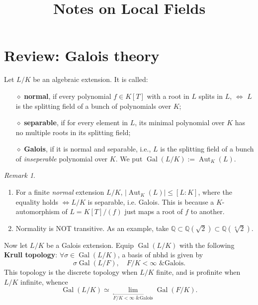 \documentclass{article}
\title{Notes on Local Fields}
\author{}
\date{}
\theoremstyle{definition}
\theoremstyle{remark}
\newtheorem*{remark}{Remark}
\DeclareMathOperator{\gal}{Gal}
\newcommand{\Q}{\mathbb{Q}}
\DeclareMathOperator{\aut}{Aut} %
\begin{document}
\maketitle

\section{Review: Galois theory}
Let $L/K$ be an algebraic extension. It is called: \begin{enumerate}
    \item [$\diamond$]\textbf{normal}, if every polynomial $f\in K[T]$ with a root in $L$ splits in $L$, $\iff$ $L$ is the splitting field of a bunch of polynomials over $K$;
    \item [$\diamond$]\textbf{separable}, if for every element in $L$, its minimal polynomial over $K$ has no multiple roots in its splitting field;
    \item [$\diamond$]\textbf{Galois}, if it is normal and separable, i.e., $L$ is the splitting field of a bunch of \textit{inseperable} polynomial over $K$. We put $\gal(L/K) := \aut_K(L)$.
\end{enumerate}
\begin{remark} {}
\begin{enumerate}
    \item For a finite \textit{normal} extension $L/K$, $|\aut_K(L)| \le [L:K]$, where the equality holds $\iff L/K$ is separable, i.e. Galois. This is because a $K$-automorphism of $L = K[T]/(f)$ just maps a root of $f$ to another.
    \item Normality is NOT transitive. As an example, take $\Q\subset\Q(\sqrt{2})\subset\Q(\sqrt[4]{2})$.
\end{enumerate}
\end{remark}
Now let $L/K$ be a Galois extension. Equip $\gal(L/K)$ with the following \textbf{Krull topology}: $\forall\sigma\in\gal(L/K)$, a basis of nbhd is given by\[\sigma\gal(L/F),\quad F/K < \infty\text{ \& Galois}.\]
This topology is the discrete topology when $L/K$ finite, and is profinite when $L/K$ infinite, whence \[\gal(L/K) \simeq \lim_{\stackrel{\longleftarrow}{F/K < \infty\text{ \& Galois}}}\gal(F/K). \]
\end{document}
